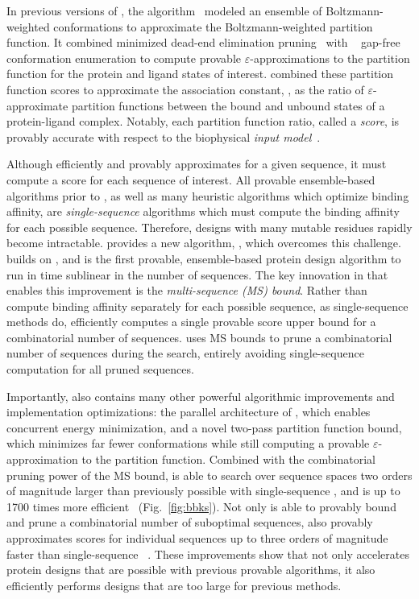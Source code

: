 \def\multisequencebound{MS\xspace}
\def\msbound{\multisequencebound}


\newcommand{\cut}[1]{}

In previous versions of \osprey, the \ks algorithm~\cite{K*} modeled an ensemble of Boltzmann-weighted conformations to approximate the Boltzmann-weighted partition function. It combined minimized dead-end elimination pruning~\cite{DEE} with \as~\cite{DEE,A*} gap-free conformation enumeration to compute provable $\varepsilon$-approximations to the partition function for the protein and ligand states of interest. \ks combined these partition function scores to approximate the association constant, \ka, as the ratio of $\varepsilon$-approximate partition functions between the bound and unbound states of a protein-ligand complex. Notably, each partition function ratio, called a \ks \emph{score}, is provably accurate with respect to the biophysical \emph{input model}~\cite{K*,minDEE,iMinDEE}. 

Although \ks efficiently and provably approximates \ka for a given sequence, it must compute a \ks score for each sequence of interest. All provable ensemble-based algorithms prior to \bbks, as well as many heuristic algorithms which optimize binding affinity, are \emph{single-sequence} algorithms which must compute the binding affinity for each possible sequence. Therefore, designs with many mutable residues rapidly become intractable.  provides a new algorithm, \bbks, which overcomes this challenge. \bbks~\cite{BBK*} builds on \ks, and is the first provable, ensemble-based protein design algorithm to run in time sublinear in the number of sequences. The key innovation in \bbks that enables this improvement is the \emph{multi-sequence (\msbound) bound}. Rather than compute binding affinity separately for each possible sequence, as single-sequence methods do, \bbks efficiently computes a single provable \ks score upper bound for a combinatorial number of sequences. \bbks uses \msbound bounds to prune a combinatorial number of sequences during the search, entirely avoiding single-sequence computation for all pruned sequences.

Importantly, \bbks also contains many other powerful algorithmic improvements and implementation optimizations: the parallel architecture of \bbks, which enables concurrent energy minimization, and a novel two-pass partition function bound, which minimizes far fewer conformations while still computing a provable $\varepsilon$-approximation to the partition function. Combined with the combinatorial pruning power of the \msbound bound, \bbks is able to search over sequence spaces two orders of magnitude larger than previously possible with single-sequence \ks, and is up to 1700 times more efficient~\cite{BBK*} (Fig.~\ref{fig:bbks}). Not only is \bbks able to provably bound and prune a combinatorial number of suboptimal sequences, \bbks also provably approximates \ks scores for individual sequences up to three orders of magnitude faster than single-sequence \ks~\cite{BBK*}. These improvements show that \bbks not only accelerates protein designs that are possible with previous provable algorithms, it also efficiently performs designs that are too large for previous methods.

